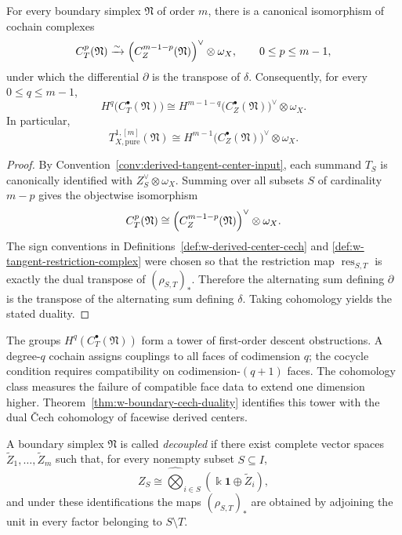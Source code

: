 \begin{theorem}
\label{thm:w-boundary-cech-duality}
For every boundary simplex $\mathfrak N$ of order $m$, there is a canonical isomorphism of cochain complexes
\[
C_T^p(\mathfrak N)
\xrightarrow{\sim}
\Bigl(C_Z^{m-1-p}(\mathfrak N)\Bigr)^\vee\otimes \omega_X,
\qquad 0\le p\le m-1,
\]
under which the differential $\partial$ is the transpose of $\delta$.
Consequently, for every $0\le q\le m-1$,
\[
H^q\bigl(C_T^\bullet(\mathfrak N)\bigr)
\cong
H^{m-1-q}\bigl(C_Z^\bullet(\mathfrak N)\bigr)^\vee\otimes \omega_X.
\]
In particular,
\[
T^{1,[m]}_{X,\mathrm{pure}}(\mathfrak N)
\cong
H^{m-1}\bigl(C_Z^\bullet(\mathfrak N)\bigr)^\vee\otimes \omega_X.
\]
\end{theorem}

\begin{proof}
By Convention~\ref{conv:derived-tangent-center-input}, each summand $T_S$ is canonically
identified with $Z_S^\vee\otimes \omega_X$. Summing over all subsets $S$ of cardinality $m-p$
gives the objectwise isomorphism
\[
C_T^p(\mathfrak N)
\cong
\Bigl(C_Z^{m-1-p}(\mathfrak N)\Bigr)^\vee\otimes \omega_X.
\]
The sign conventions in Definitions~\ref{def:w-derived-center-cech} and
\ref{def:w-tangent-restriction-complex} were chosen so that the restriction map
$\operatorname{res}_{S,T}$ is exactly the dual transpose of $(\rho_{S,T})_*$. Therefore the alternating
sum defining $\partial$ is the transpose of the alternating sum defining $\delta$.
Taking cohomology yields the stated duality.
\end{proof}

\begin{remark}[Interpretation]
\label{rem:w-boundary-cech-interpretation}
The groups $H^q(C_T^\bullet(\mathfrak N))$ form a tower of first-order descent obstructions.
A degree-$q$ cochain assigns couplings to all faces of codimension $q$; the cocycle condition
requires compatibility on codimension-$(q+1)$ faces. The cohomology class measures
the failure of compatible face data to extend one dimension higher.
Theorem~\ref{thm:w-boundary-cech-duality} identifies this tower with the dual \v{C}ech cohomology of
facewise derived centers.
\end{remark}

\begin{definition}
\label{def:w-decoupled-simplex}
A boundary simplex $\mathfrak N$ is called \emph{decoupled} if there exist complete vector spaces
$\widetilde Z_1,\dots,\widetilde Z_m$ such that, for every nonempty subset $S\subseteq I$,
\[
Z_S\cong \widehat\bigotimes_{i\in S}(\Bbbk\mathbf{1}\oplus \widetilde Z_i),
\]
and under these identifications the maps $(\rho_{S,T})_*$ are obtained by adjoining the unit in every
factor belonging to $S\setminus T$.
\end{definition}

